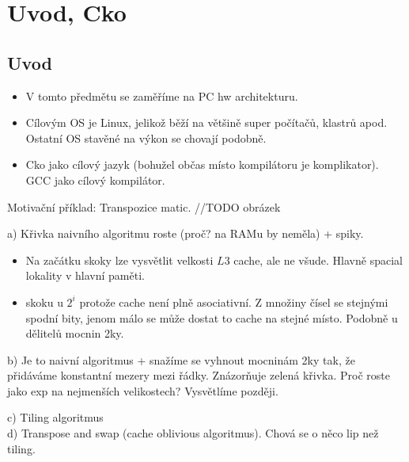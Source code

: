 \section{\texorpdfstring{Uvod, Cko}{Uvod, Cko}}
\vspace{5mm}
\large


\subsection{Uvod}

\begin{itemize}
	\item V tomto předmětu se zaměříme na PC hw architekturu.
	\item Cílovým OS je Linux, jelikož běží na většině super počítačů, klastrů apod.
		Ostatní OS stavěné na výkon se chovají podobně.
	\item Cko jako cílový jazyk (bohužel občas místo kompilátoru je komplikator).
		GCC jako cílový kompilátor.
\end{itemize}

\begin{example}
	Motivační příklad: Transpozice matic.
	//TODO obrázek

	a) Křivka naivního algoritmu roste (proč? na RAMu by neměla) + spiky.
	\begin{itemize}
		\item Na začátku skoky lze vysvětlit velkosti $L3$ cache, ale ne všude.
			Hlavně spacial lokality v hlavní paměti.
		\item skoku u $2^i$ protože cache není plně asociativní.
			Z množiny čísel se stejnými spodní bity, jenom málo se může dostat to cache na stejné místo.
			Podobně u dělitelů mocnin 2ky.
	\end{itemize}
	b) Je to naivní algoritmus + snažíme se vyhnout mocninám 2ky tak, že přidáváme konstantní mezery mezi řádky.
	Znázorňuje zelená křivka.
	Proč roste jako exp na nejmenších velikostech? Vysvětlíme později.

	c) Tiling algoritmus \\
	d) Transpose and swap (cache oblivious algoritmus).
	Chová se o něco lip než tiling.

\end{example}

